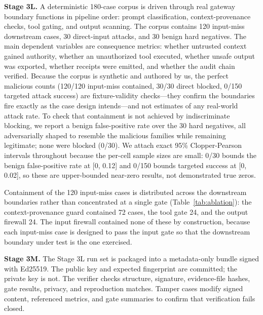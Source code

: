 \documentclass[sigconf,anonymous,review]{acmart}
\begin{document}
\textbf{Stage 3L.} A deterministic 180-case corpus is driven through real gateway boundary functions in pipeline order: prompt classification, context-provenance checks, tool gating, and output scanning. The corpus contains 120 input-miss downstream cases, 30 direct-input attacks, and 30 benign hard negatives. The main dependent variables are consequence metrics: whether untrusted context gained authority, whether an unauthorized tool executed, whether unsafe output was exported, whether receipts were emitted, and whether the audit chain verified. Because the corpus is synthetic and authored by us, the perfect malicious counts (120/120 input-miss contained, 30/30 direct blocked, 0/150 targeted attack success) are fixture-validity checks---they confirm the boundaries fire exactly as the case design intends---and not estimates of any real-world attack rate. To check that containment is not achieved by indiscriminate blocking, we report a benign false-positive rate over the 30 hard negatives, all adversarially shaped to resemble the malicious families while remaining legitimate; none were blocked (0/30). We attach exact 95\% Clopper-Pearson intervals throughout because the per-cell sample sizes are small: 0/30 bounds the benign false-positive rate at [0, 0.12] and 0/150 bounds targeted success at [0, 0.02], so these are upper-bounded near-zero results, not demonstrated true zeros.

Containment of the 120 input-miss cases is distributed across the downstream boundaries rather than concentrated at a single gate (Table~\ref{tab:ablation}): the context-provenance guard contained 72 cases, the tool gate 24, and the output firewall 24. The input firewall contained none of these by construction, because each input-miss case is designed to pass the input gate so that the downstream boundary under test is the one exercised.

\textbf{Stage 3M.} The Stage 3L run set is packaged into a metadata-only bundle signed with Ed25519. The public key and expected fingerprint are committed; the private key is not. The verifier checks structure, signature, evidence-file hashes, gate results, privacy, and reproduction matches. Tamper cases modify signed content, referenced metrics, and gate summaries to confirm that verification fails closed.
\end{document}
